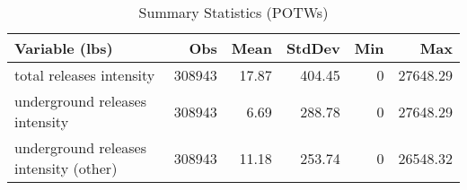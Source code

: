 \begin{table}[H]
    \centering
    \caption{Summary Statistics (POTWs)}
    \label{tab:sumstat-potws}
    \begin{tabular}{lrrrrr}
        \toprule\toprule
        Variable (lbs)                         & Obs    & Mean  & StdDev & Min & Max      \\ \midrule
        total releases intensity               & 308943 & 17.87 & 404.45 & 0   & 27648.29 \\
        underground releases intensity         & 308943 & 6.69  & 288.78 & 0   & 27648.29 \\
        underground releases intensity (other) & 308943 & 11.18 & 253.74 & 0   & 26548.32 \\ \bottomrule \bottomrule
    \end{tabular}
\end{table}
